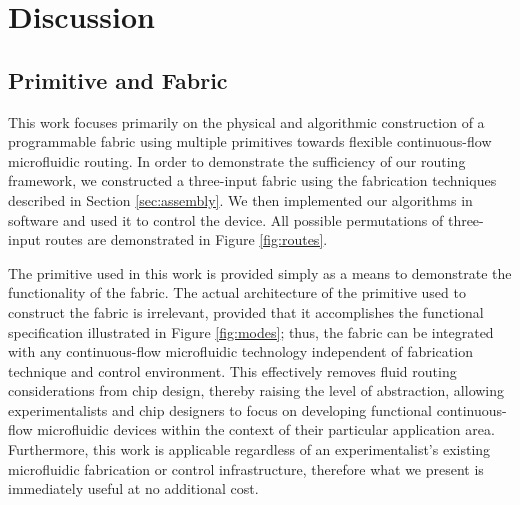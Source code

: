 \section{Discussion}

\subsection{Primitive and Fabric}
This work focuses primarily on the physical and algorithmic construction of a programmable fabric using multiple primitives towards flexible continuous-flow microfluidic routing. In order to demonstrate the sufficiency of our routing framework, we constructed a three-input fabric using the fabrication techniques described in Section \ref{sec:assembly}. We then implemented our algorithms in software and used it to control the device. All possible permutations of three-input routes are demonstrated in Figure \ref{fig:routes}.

The primitive used in this work is provided simply as a means to demonstrate the functionality of the fabric. The actual architecture of the primitive used to construct the fabric is irrelevant, provided that it accomplishes the functional specification illustrated in Figure \ref{fig:modes}; thus, the fabric can be integrated with any continuous-flow microfluidic technology independent of fabrication technique and control environment. This effectively removes fluid routing considerations from chip design, thereby raising the level of abstraction, allowing experimentalists and chip designers to focus on developing functional continuous-flow microfluidic devices within the context of their particular application area. Furthermore, this work is applicable regardless of an experimentalist's existing microfluidic fabrication or control infrastructure, therefore what we present is immediately useful at no additional cost.

